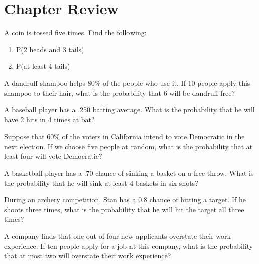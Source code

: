 \section{Chapter Review}

\begin{puzzle}
    A coin is tossed five times. Find the following:
    \begin{enumerate}
        \item P(2 heads and 3 tails)
        \item P(at least 4 tails)
    \end{enumerate}
\end{puzzle}

\begin{puzzle}
    A dandruff shampoo helps 80\% of the people who use it. If 10 people apply this shampoo to their hair, what is the probability that 6 will be dandruff free?
\end{puzzle}

\begin{puzzle}
    A baseball player has a .250 batting average. What is the probability that he will have 2 hits in 4 times at bat?
\end{puzzle}

\begin{puzzle}
    Suppose that 60\% of the voters in California intend to vote Democratic in the next election. If we choose five people at random, what is the probability that at least four will vote Democratic?
\end{puzzle}

\begin{puzzle}
    A basketball player has a .70 chance of sinking a basket on a free throw. What is the probability that he will sink at least 4 baskets in six shots?
\end{puzzle}

\begin{puzzle}
    During an archery competition, Stan has a 0.8 chance of hitting a target. If he shoots three times, what is the probability that he will hit the target all three times?
\end{puzzle}

\begin{puzzle}
    A company finds that one out of four new applicants overstate their work experience. If ten people apply for a job at this company, what is the probability that at most two will overstate their work experience?
\end{puzzle}

